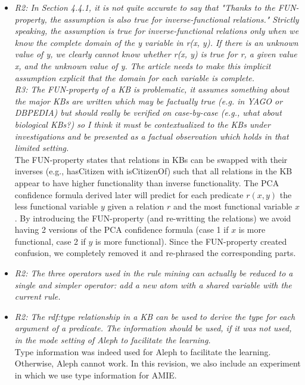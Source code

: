 \begin{figure*}[t!]
\hspace{.1\textwidth}
\begin{minipage}{.8\textwidth}
\large 
     \begin{itemize}
     
      \item \textit{R2: In Section 4.4.1, it is not quite accurate to say that "Thanks to the FUN-property, the assumption is also true for inverse-functional relations." 
      Strictly speaking, the assumption is true for inverse-functional relations only when we know the complete domain of the y variable in r(x, y). 
      If there is an unknown value of y, we clearly cannot know whether r(x, y) is true for r, a given value x, and the unknown value of y. 
      The article needs to make this implicit assumption explicit that the domain for each variable is complete. \\  
      R3: The FUN-property of a KB is problematic, it assumes something about the major KBs are written which may be factually true (e.g. in YAGO or DBPEDIA) 
      but should really be verified on case-by-case (e.g., what about biological KBs?) so I think it must be contextualized to the KBs under investigations and be presented as a 
      factual observation which holds in that limited setting.  \\        
      }
      The FUN-property states that relations in KBs can be swapped with their inverses (e.g., hasCitizen with isCitizenOf) such that all relations in the KB appear to have higher functionality
      than inverse functionality. The PCA confidence formula derived later will predict for each predicate $r(x,y)$ the less functional variable $y$ given a relation $r$ and the most functional variable $x$.
      By introducing the FUN-property (and re-writting the relations) we avoid having 2 versions of the PCA confidence formula (case 1 if $x$ is more functional, case 2 if $y$ is more functional).
      Since the FUN-property created confusion, we completely removed it and re-phrased the corresponding parts. 
      
      \item \textit{R2: The three operators used in the rule mining can actually be reduced to a single and simpler operator: add a new atom with a shared variable with the current rule. \\  }
      
      \item \textit{R2: The rdf:type relationship in a KB can be used to derive the type for each argument of a predicate. 
      The information should be used, if it was not used, in the mode setting of Aleph to facilitate the learning.\\  }
      Type information was indeed used for Aleph to facilitate the learning. Otherwise, Aleph cannot work. 
      In this revision, we also include an experiment in which we use type information for AMIE. 
      
         \end{itemize}
\end{minipage}
\end{figure*}

